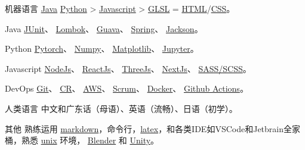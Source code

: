 
\begin{cvskills}

  \cvskill
    {机器语言}
    {\href{https://www.java.com/en/}{Java} \approx\、 \href{https://www.python.org/}{Python} >\、 \href{https://www.javascript.com/}{Javascript} > \href{https://www.khronos.org/opengl/wiki/OpenGL_Shading_Language}{GLSL} = \href{https://developer.mozilla.org/en-US/docs/Glossary/HTML5}{HTML}/\href{https://developer.mozilla.org/en-US/docs/Web/CSS}{CSS}。}
  
  \cvskill
    {Java} %
    {\href{https://junit.org/junit4/}{JUnit}、 \href{https://projectlombok.org/}{Lombok}、 \href{https://github.com/google/guava}{Guava}、 \href{https://spring.io/}{Spring}、 \href{https://github.com/FasterXML/jackson}{Jackson}。}  %

  \cvskill
    {Python} %
    {\href{https://pytorch.org/}{Pytorch}、 \href{https://numpy.org/}{Numpy}、 \href{https://matplotlib.org/}{Matplotlib}、 \href{https://jupyter.org/}{Jupyter}。}  %

  \cvskill
    {Javascript} %
    {\href{https://nodejs.org/en/}{NodeJs}、 \href{https://reactjs.org/}{ReactJs}、 \href{https://threejs.org/}{ThreeJs}、 \href{https://nextjs.org/}{NextJs}、 \href{https://sass-lang.com/}{SASS/SCSS}。}
  
  \cvskill
    {DevOps} %
    {\href{https://git-scm.com/}{Git}、 \href{https://en.wikipedia.org/wiki/Code_review}{CR}、 \href{https://aws.amazon.com/}{AWS}、 \href{https://www.scrum.org/resources/what-is-scrum}{Scrum}、 \href{https://www.docker.com/}{Docker}、 \href{https://github.com/features/actions}{Github Actions}。}
 
  \cvskill
    {人类语言}
    {中文和广东话（母语）、英语（流畅）、日语（初学）。}

  \cvskill
    {其他} %
    {熟练运用 \href{https://en.wikipedia.org/wiki/Markdown}{markdown}，命令行，\href{https://www.latex-project.org/}{latex}，和各类IDE如VSCode和Jetbrain全家桶，熟悉 \href{https://en.wikipedia.org/wiki/Unix}{unix} 环境， \href{https://www.blender.org/}{Blender} 和 \href{https://unity.com/}{Unity}。}

\end{cvskills}
